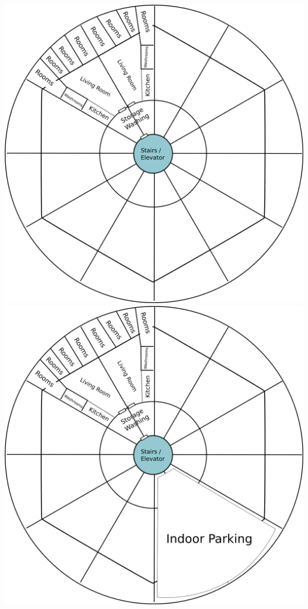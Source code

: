 \documentclass[CSHFoundation.tex]{subfiles}
\begin{document}
\begin{center}
\includegraphics[scale=0.4]{3-community home dorms.png}
\includegraphics[scale=0.4]{3-community home entry housing.png}

\end{center}
\end{document}
